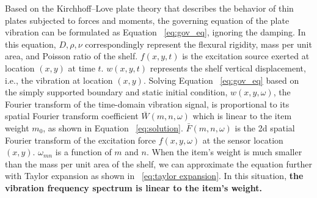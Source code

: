 Based on the Kirchhoff–Love plate theory that describes the behavior of thin plates subjected to forces and moments, the governing equation of the plate vibration can be formulated as Equation ~\ref{eq:gov_eq}, ignoring the damping. In this equation, $D, \rho, \nu$ correspondingly represent the flexural rigidity, mass per unit area, and Poisson ratio of the shelf. $f(x, y, t)$ is the excitation source exerted at location $(x, y)$ at time $t$. $w(x,y,t)$ represents the shelf vertical displacement, i.e., the vibration at location $(x, y)$. Solving Equation ~\ref{eq:gov_eq} based on the simply supported boundary and static initial condition, $w(x, y, \omega)$, the Fourier transform of the time-domain vibration signal, is proportional to its spatial Fourier transform coefficient $\bar{W}(m,n,\omega)$ which is linear to the item weight $m_0$, as shown in Equation ~\ref{eq:solution}. $\bar{F}(m,n,\omega)$ is the 2d spatial Fourier transform of the excitation force $f(x, y, \omega)$ at the sensor location $(x,y)$. $\omega_{mn}$ is a function of $m$ and $n$. When the item's weight is much smaller than the mass per unit area of the shelf, we can approximate the equation further with Taylor expansion as shown in ~\ref{eq:taylor expansion}. In this situation, \textbf{the vibration frequency spectrum is linear to the item's weight.}



